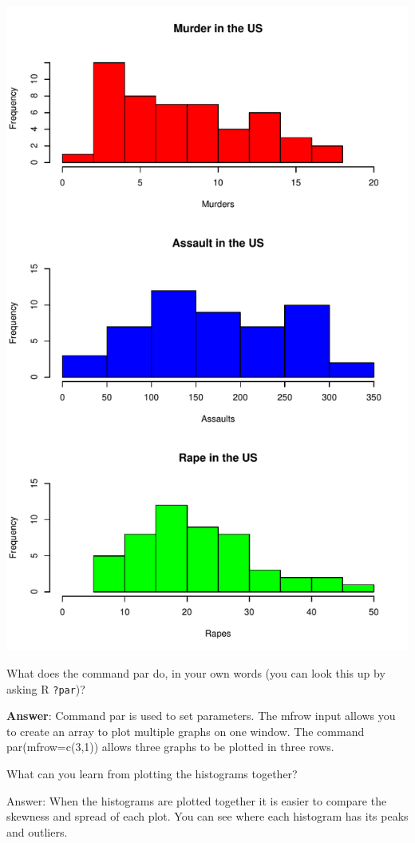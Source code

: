 \documentclass[
]{article}
\begin{document}
\includegraphics{Assignments_files/figure-latex/unnamed-chunk-7-1.pdf}

What does the command par do, in your own words (you can look this up by
asking R \texttt{?par})?

\textbf{Answer}: Command par is used to set parameters. The mfrow input
allows you to create an array to plot multiple graphs on one window. The
command par(mfrow=c(3,1)) allows three graphs to be plotted in three
rows.

What can you learn from plotting the histograms together?

Answer: When the histograms are plotted together it is easier to compare
the skewness and spread of each plot. You can see where each histogram
has its peaks and outliers.
\end{document}
